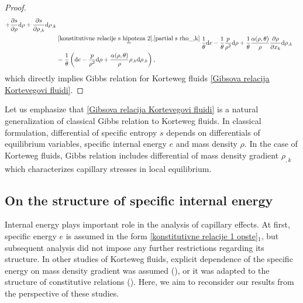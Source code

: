 \documentclass[a4paper,fleqn]{cas-sc}
\theoremstyle{definition}
\begin{document}
\begin{proof}
\begin{align*}
		+ \dfrac{\partial s}{\partial\rho} \mathrm{d}\rho 
		+ \dfrac{\partial s}{\partial\rho_{,k}} \mathrm{d}\rho_{,k} 
		\\
		& \overset{\eqref{konstitutivne relacije s hipoteza 2},\eqref{partial s rho_,k}}{=} 
		\dfrac{1}{\theta} \mathrm{d}e - \dfrac{1}{\theta}\dfrac{p}{\rho^2} \mathrm{d}\rho 
		+ \dfrac{1}{\theta} \dfrac{\alpha(\rho,\theta)}{\rho} 
		\dfrac{\partial\rho}{\partial x_k} \mathrm{d}\rho_{,k} 
		\\
		& = \dfrac{1}{\theta} \left( \mathrm{d}e - \dfrac{p}{\rho^2} \mathrm{d}\rho 
		+ \dfrac{\alpha(\rho,\theta)}{\rho} \rho_{,k} \mathrm{d}\rho_{,k} \right), 
	\end{align*}
	which directly implies Gibbs relation for Korteweg fluids \eqref{Gibsova relacija Kortevegovi fluidi}. 
\end{proof}
Let us emphasize that \eqref{Gibsova relacija Kortevegovi fluidi} is a natural generalization of classical Gibbs relation to Korteweg fluids. In classical formulation, differential of specific entropy $s$ depends on differentials of equilibrium variables, specific internal energy $e$ and mass density $\rho$. In the case of Korteweg fluids, Gibbs relation includes differential of mass density gradient $\rho_{,k}$ which characterizes capillary stresses in local equilibrium. 

\subsection{On the structure of specific internal energy} \label{Sec:EnergyStructure}

Internal energy plays important role in the analysis of capillary effects. At first, specific energy $e$ is assumed in the form \eqref{konstitutivne relacije 1 opste}$_{1}$, but subsequent analysis did not impose any further restrictions regarding its structure. In other studies of Korteweg fluids, explicit dependence of the specific energy on mass density gradient was assumed (\cite{anderson1998diffuse}), or it was adapted to the structure of constitutive relations (\cite{heida2010compressible}). Here, we aim to reconsider our results from the perspective of these studies. 
\end{document}
